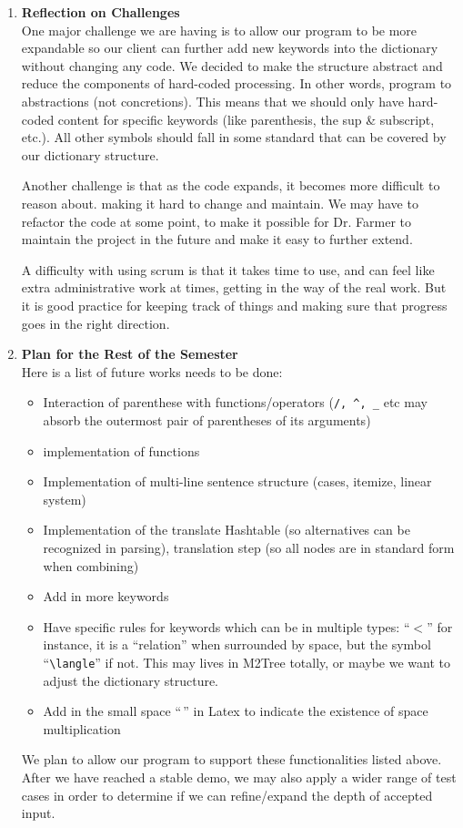 \documentclass[11pt]{article}
\theoremstyle{definition}
\begin{document}
\begin{enumerate}
\item \textbf{Reflection on Challenges} \\
One major challenge we are having is to allow our program to be more expandable so our client can further add new keywords into the dictionary without changing any code. We decided to make the structure abstract and reduce the components of hard-coded processing. In other words, program to abstractions (not concretions). This means that we should only have hard-coded content for specific keywords (like parenthesis, the sup \& subscript, etc.). All other symbols should fall in some standard that can be covered by our dictionary structure.

Another challenge is that as the code expands, it becomes more difficult to reason about. making it hard to change and maintain. We may have to refactor the code at some point, to make it possible for Dr. Farmer to maintain the project in the future and make it easy to further extend. 

A difficulty with using scrum is that it takes time to use, and can feel like extra administrative work at times, getting in the way of the real work. But it is good practice for keeping track of things and making sure that progress goes in the right direction. \\

\item \textbf{Plan for the Rest of the Semester} \\
Here is a list of future works needs to be done:
\begin{itemize}
\item Interaction of parenthese with functions/operators (\verb|/, ^, _| etc may absorb the outermost pair of parentheses of its arguments)
\item implementation of functions
\item Implementation of multi-line sentence structure (cases, itemize, linear system)
\item Implementation of the translate Hashtable (so alternatives can be recognized in parsing), translation step (so all nodes are in standard form when combining)
\item Add in more keywords
\item Have specific rules for keywords which can be in multiple types: “$<$” for instance, it is a “relation” when surrounded by space, but the symbol “\verb|\langle|” if not. This may lives in M2Tree totally, or maybe we want to adjust the dictionary structure.
\item Add in the small space “\,” in Latex to indicate the existence of space multiplication
\end{itemize}
We plan to allow our program to support these functionalities listed above. After we have reached a stable demo, we may also apply a wider range of test cases in order to determine if we can refine/expand the depth of accepted input.

\end{enumerate}
\end{document}
